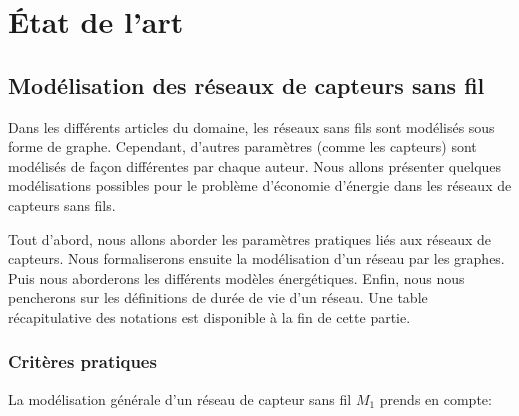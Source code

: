 
\chapter{État de l'art}\label{etat_art}

\section{Modélisation des réseaux de capteurs sans fil}


Dans les différents articles du domaine, les réseaux sans fils sont modélisés sous forme de graphe. Cependant, d'autres paramètres (comme les capteurs) sont modélisés de façon différentes par chaque auteur. Nous allons présenter
 quelques modélisations possibles pour le problème d'économie d'énergie dans les réseaux de capteurs sans fils.

Tout d'abord, nous allons aborder les paramètres pratiques liés aux réseaux de capteurs. Nous formaliserons ensuite la modélisation d'un réseau par les graphes. Puis nous aborderons les différents modèles énergétiques. Enfin, nous 
nous pencherons sur les définitions de durée de vie d'un réseau. Une table récapitulative des notations est disponible à la fin de cette partie.

\subsection{Critères pratiques}\label{modelePratique}


La modélisation générale d'un réseau de capteur sans fil \textbf{$M_1$} prends en compte: 

